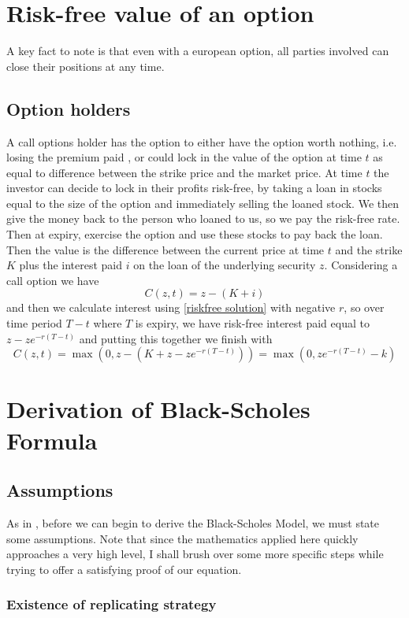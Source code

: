 \documentclass[11pt]{article} %
\begin{document}
\printbibliography %

\appendix

\section{Risk-free value of an option}
A key fact to note is that even with a 
european option, all parties involved can close their positions at any time. 
\subsection*{Option holders}
A call options holder has the option to either have the option worth nothing, i.e. 
losing the premium paid , or could lock in the value of the option at time $t$ as 
equal to difference between the strike price and the market price. At time $t$ the 
investor can decide to lock in their profits risk-free, by taking a loan in stocks 
equal to the size of the option and immediately selling the loaned stock. We then give 
the money back to the person who loaned to us, so we pay the risk-free rate. Then at 
expiry, exercise the option and use these stocks to pay back the loan. Then the value is 
the difference between the current price at time $t$ and the strike $K$ plus the 
interest paid $i$ on the loan of the underlying security 
$z$. Considering a call option we have 
 $$ C(z,t) = z - (K + i)$$
 and then we calculate interest using \eqref{riskfree solution} with negative $r$, so 
 over time period $T-t$ where $T$ is expiry, we have risk-free interest paid equal to 
 $z - ze^{-r(T-t)}$ 
 and putting this together we finish with 
 $$
C(z,t) =\max{(0, z - (K + z - ze^{-r(T-t)}))} = \max{(0, ze^{-r(T-t)} - k)}
 $$

\section{Derivation of Black-Scholes Formula}\label{blackScholesAppendix}
\subsection{Assumptions}

As in \cite{blackscholes}, before we can begin to derive the Black-Scholes Model, we must 
state some assumptions. Note that since the mathematics applied here quickly approaches a 
very high level, I shall brush over some more specific steps while trying to offer a 
satisfying proof of our equation.
\subsubsection{Existence of replicating strategy}\label{replicatingstrategy}
\end{document}

